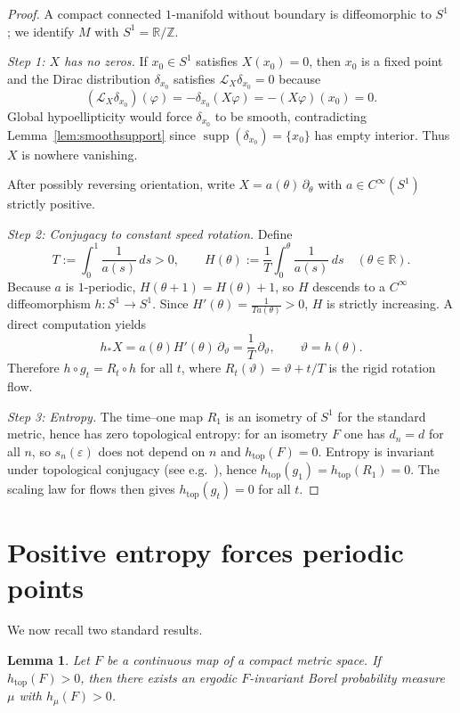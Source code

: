 \documentclass[11pt]{article}
\newtheorem{lemma}[theorem]{Lemma}
\theoremstyle{definition}
\theoremstyle{remark}
\newcommand{\Lie}{\mathcal{L}}
\newcommand{\R}{\mathbb{R}}
\newcommand{\Z}{\mathbb{Z}}
\newcommand{\supp}{\operatorname{supp}}
\newcommand{\htop}{h_{\mathrm{top}}}
\begin{document}
\begin{proof}
A compact connected $1$-manifold without boundary is diffeomorphic to $S^1$ \cite[Thm.~8.1]{LeeSM}; we identify $M$ with $S^1=\R/\Z$.

\emph{Step 1: $X$ has no zeros.}
If $x_0\in S^1$ satisfies $X(x_0)=0$, then $x_0$ is a fixed point and the Dirac distribution $\delta_{x_0}$ satisfies
$\Lie_X\delta_{x_0}=0$ because
\[
(\Lie_X\delta_{x_0})(\varphi)=-\delta_{x_0}(X\varphi)=-(X\varphi)(x_0)=0.
\]
Global hypoellipticity would force $\delta_{x_0}$ to be smooth, contradicting Lemma~\ref{lem:smoothsupport} since $\supp(\delta_{x_0})=\{x_0\}$ has empty interior.
Thus $X$ is nowhere vanishing.

After possibly reversing orientation, write $X=a(\theta)\,\partial_\theta$ with $a\in C^\infty(S^1)$ strictly positive.

\emph{Step 2: Conjugacy to constant speed rotation.}
Define
\[
T:=\int_0^1 \frac{1}{a(s)}\,ds>0,\qquad
H(\theta):=\frac{1}{T}\int_0^\theta \frac{1}{a(s)}\,ds\quad(\theta\in\R).
\]
Because $a$ is $1$-periodic, $H(\theta+1)=H(\theta)+1$, so $H$ descends to a $C^\infty$ diffeomorphism $h:S^1\to S^1$.
Since $H'(\theta)=\frac{1}{Ta(\theta)}>0$, $H$ is strictly increasing.
A direct computation yields
\[
h_*X = a(\theta)H'(\theta)\,\partial_\vartheta = \frac{1}{T}\,\partial_\vartheta,
\qquad \vartheta=h(\theta).
\]
Therefore $h\circ g_t = R_t\circ h$ for all $t$, where $R_t(\vartheta)=\vartheta+t/T$ is the rigid rotation flow.

\emph{Step 3: Entropy.}
The time--one map $R_1$ is an isometry of $S^1$ for the standard metric, hence has zero topological entropy:
for an isometry $F$ one has $d_n=d$ for all $n$, so $s_n(\varepsilon)$ does not depend on $n$ and $\htop(F)=0$.
Entropy is invariant under topological conjugacy (see e.g.\ \cite[\S7]{Walters}), hence $\htop(g_1)=\htop(R_1)=0$.
The scaling law for flows \cite{BW} then gives $\htop(g_t)=0$ for all $t$.
\end{proof}

\section{Positive entropy forces periodic points}

We now recall two standard results.

\begin{lemma}\label{lem:positive_entropy_measure}
Let $F$ be a continuous map of a compact metric space.
If $\htop(F)>0$, then there exists an ergodic $F$-invariant Borel probability measure $\mu$ with $h_\mu(F)>0$.
\end{lemma}
\end{document}
